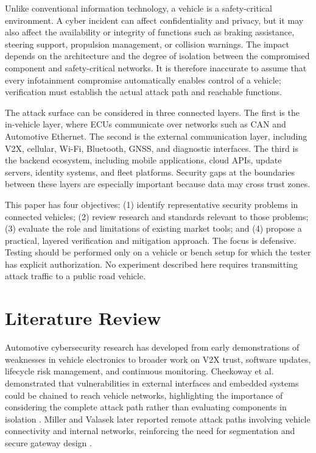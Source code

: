 \documentclass[11pt]{article}
\begin{document}
Unlike conventional information technology, a vehicle is a safety-critical environment. A cyber incident can affect confidentiality and privacy, but it may also affect the availability or integrity of functions such as braking assistance, steering support, propulsion management, or collision warnings. The impact depends on the architecture and the degree of isolation between the compromised component and safety-critical networks. It is therefore inaccurate to assume that every infotainment compromise automatically enables control of a vehicle; verification must establish the actual attack path and reachable functions.

The attack surface can be considered in three connected layers. The first is the in-vehicle layer, where ECUs communicate over networks such as CAN and Automotive Ethernet. The second is the external communication layer, including V2X, cellular, Wi-Fi, Bluetooth, GNSS, and diagnostic interfaces. The third is the backend ecosystem, including mobile applications, cloud APIs, update servers, identity systems, and fleet platforms. Security gaps at the boundaries between these layers are especially important because data may cross trust zones.

This paper has four objectives: (1) identify representative security problems in connected vehicles; (2) review research and standards relevant to those problems; (3) evaluate the role and limitations of existing market tools; and (4) propose a practical, layered verification and mitigation approach. The focus is defensive. Testing should be performed only on a vehicle or bench setup for which the tester has explicit authorization. No experiment described here requires transmitting attack traffic to a public road vehicle.

\section{Literature Review}
Automotive cybersecurity research has developed from early demonstrations of weaknesses in vehicle electronics to broader work on V2X trust, software updates, lifecycle risk management, and continuous monitoring. Checkoway et al. demonstrated that vulnerabilities in external interfaces and embedded systems could be chained to reach vehicle networks, highlighting the importance of considering the complete attack path rather than evaluating components in isolation \cite{checkoway2011}. Miller and Valasek later reported remote attack paths involving vehicle connectivity and internal networks, reinforcing the need for segmentation and secure gateway design \cite{miller2015}.
\end{document}
